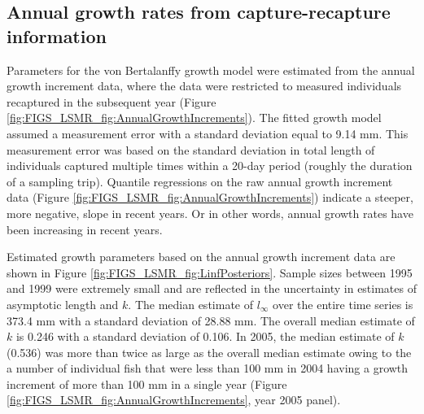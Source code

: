 

\subsection{Annual growth rates from capture-recapture information} %
\label{sub:annual_growth_rates_from_capture_recapture_information}

Parameters for the von Bertalanffy growth model were estimated from the annual growth increment data, where the data were restricted to measured individuals recaptured in the subsequent year (Figure \ref{fig:FIGS_LSMR_fig:AnnualGrowthIncrements}).  The fitted growth model assumed a measurement error with a standard deviation equal to 9.14 mm.  This measurement error was based on the standard deviation in total length of individuals captured multiple times within a 20-day period (roughly the duration of a sampling trip).  Quantile regressions on the raw annual growth increment data (Figure \ref{fig:FIGS_LSMR_fig:AnnualGrowthIncrements}) indicate a steeper, more negative, slope in recent years.  Or in other words, annual growth rates have been increasing in recent years.




Estimated growth parameters based on the annual growth increment data are shown in Figure \ref{fig:FIGS_LSMR_fig:LinfPosteriors}.  Sample sizes between 1995 and 1999 were extremely small and are reflected in the uncertainty in estimates of asymptotic length and $k$.  The median estimate of $l_\infty$ over the entire time series is 373.4 mm with a standard deviation of 28.88 mm.  The overall median estimate of $k$ is 0.246 with a standard deviation of 0.106.  In 2005, the median estimate of $k$ (0.536) was more than twice as large as the overall median estimate owing to the a number of individual fish that were less than 100 mm in 2004 having a growth increment of more than 100 mm in a single year (Figure \ref{fig:FIGS_LSMR_fig:AnnualGrowthIncrements}, year 2005 panel).

